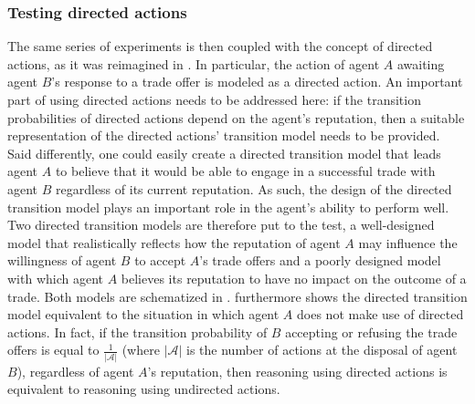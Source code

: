 \subsubsection{Testing directed actions}
\label{sub:directedtest}
The same series of experiments is then coupled with the concept of directed actions, as it was reimagined in . In particular, the action of agent $A$ awaiting agent $B$'s response to a trade offer is modeled as a directed action. An important part of using directed actions needs to be addressed here: if the transition probabilities of directed actions depend on the agent's reputation, then a suitable representation of the directed actions' transition model needs to be provided. Said differently, one could easily create a directed transition model that leads agent $A$ to believe that it would be able to engage in a successful trade with agent $B$ regardless of its current reputation. As such, the design of the directed transition model plays an important role in the agent's ability to perform well. Two directed transition models are therefore put to the test, a well-designed model that realistically reflects how the reputation of agent $A$ may influence the willingness of agent $B$ to accept $A$'s trade offers and a poorly designed model with which agent $A$ believes its reputation to have no impact on the outcome of a trade. Both models are schematized in .  furthermore shows the directed transition model equivalent to the situation in which agent $A$ does not make use of directed actions. In fact, if the transition probability of $B$ accepting or refusing the trade offers is equal to $\frac{1}{|\mathcal{A}|}$ (where $|\mathcal{A}|$ is the number of actions at the disposal of agent $B$), regardless of agent $A$'s reputation, then reasoning using directed actions is equivalent to reasoning using undirected actions.




